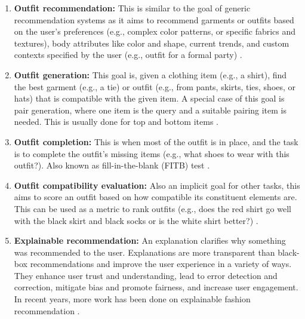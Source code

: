 		\begin{enumerate}
			\item \textbf{Outfit recommendation:} This is similar to the goal of generic recommendation systems as it aims to recommend garments or outfits based on the user's preferences (e.g., complex color patterns, or specific fabrics and textures), body attributes like color and shape, current trends, and custom contexts specified by the user (e.g., outfit for a formal party) \cite{DBLP:conf/sigir/LiW0CXC20, 9156794, 8932738, DBLP:conf/mm/HidayatiHCHFC18, DBLP:journals/tmm/ZhangJGZZLT17, DBLP:conf/waim/ShaWZFZY16}.
			
			\item \textbf{Outfit generation:} This goal is, given a clothing item (e.g., a shirt), find the best garment (e.g., a tie) or outfit (e.g., from pants, skirts, ties, shoes, or hats) that is compatible with the given item. A special case of this goal is pair generation, where one item is the query and a suitable pairing item is needed. This is usually done for top and bottom items \cite{9156535, 9893574, DBLP:conf/kdd/ChenHXGGSLPZZ19}.
			
			\item \textbf{Outfit completion:} This is when most of the outfit is in place, and the task is to complete the outfit's missing items (e.g., what shoes to wear with this outfit?). Also known as fill-in-the-blank (FITB) test \cite{9857004, DBLP:journals/corr/abs-2005-06584, DBLP:conf/mm/SongHLCXN19}.
			
			\item \textbf{Outfit compatibility evaluation:} Also an implicit goal for other tasks, this aims to score an outfit based on how compatible its constituent elements are. This can be used as a metric to rank outfits (e.g., does the red shirt go well with the black skirt and black socks or is the white shirt better?) \cite{DBLP:journals/eswa/MoZPW23, 10049142, DBLP:journals/eswa/BalimO23,9775146, DBLP:conf/iccvw/KimSMSSP21, DBLP:journals/ijon/SunHWZP20, DBLP:conf/sigir/DongWSDN20, DBLP:conf/www/YinL0019, DBLP:conf/aaai/YangMLWC19}.

			\item \textbf{Explainable recommendation:} An explanation clarifies why something was recommended to the user. Explanations are more transparent than black-box recommendations and improve the user experience in a variety of ways. They enhance user trust and understanding, lead to error detection and correction, mitigate bias and promote fairness, and increase user engagement. In recent years, more work has been done on explainable fashion recommendation \cite{DBLP:journals/tomccap/YangSFWDN21, DBLP:journals/www/LiCH21, 9522737, DBLP:journals/tkde/LinRCRMR20, DBLP:conf/wacv/TangsengO20, DBLP:conf/ijcai/HouWCLZL19, DBLP:conf/sigir/ChenCXZ0QZ19}.
		\end{enumerate}
	
